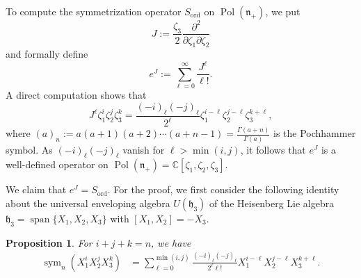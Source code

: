 \documentclass[a4paper,11pt,reqno]{amsart}
\newcommand{\frakh}{\mathfrak{h}}
\newcommand{\frakn}{\mathfrak{n}}
\newcommand{\0}{{\bf 0}}
\newcommand{\C}{\mathbb{C}}
\newcommand{\1}{{\bf 1}}
\DeclareMathOperator{\Span}{span}
\DeclareMathOperator{\Pol}{Pol}
\newcommand{\ord}{{\mathrm{ord}}}
\DeclareMathOperator{\sym}{sym}
\theoremstyle{plain}
\newtheorem{proposition}[equation]{Proposition}
\theoremstyle{definition}
\numberwithin{equation}{section}
\theoremstyle{definition}
\begin{document}
To compute the symmetrization operator $S_{\ord}$ on $\Pol(\frakn_+)$,
we put
\begin{equation*}
J:=\frac{\zeta_3}{2}\frac{\partial^2}{\partial\zeta_1\partial\zeta_2}
\end{equation*}
and formally define
\begin{equation*}
e^{J}:=\sum_{\ell=0}^\infty \frac{J^\ell}{\ell!}.
\end{equation*}
A direct computation shows that
\begin{equation}\label{eqn:JL}
J^\ell
\zeta_1^i\zeta_2^j\zeta_3^k = 
\frac{(-i)_\ell (-j)_\ell}{2^\ell}\zeta_1^{i-\ell}\zeta_2^{j-\ell}\zeta_3^{k+\ell},
\end{equation}
where $(a)_n:=a(a+1)(a+2)\cdots (a+n-1) = \frac{\Gamma(a+n)}{\Gamma(a)}$ is the Pochhammer symbol.
As $(-i)_\ell(-j)_\ell$ vanish for $\ell>\min(i,j)$, it follows that $e^{J}$ is a well-defined operator on $\Pol(\frakn_+)= \C[\zeta_1, \zeta_2, \zeta_3]$.

We claim that $e^{J}=S_{\ord}$.
For the proof, we first consider the following identity about
the universal enveloping algebra
$U(\frakh_3)$ of the Heisenberg Lie algebra 
$\frakh_3 = \Span\{X_1, X_2, X_3\}$ with $[X_1, X_2]=-X_3$.

\begin{proposition}\label{Prop:SymmetrizationMapIdentity}
For $i+j+k =n$,
we have
\begin{align}\label{eqn:HeisSym}
\sym_n(X_1^iX_2^jX_3^k)
&=\sum_{\ell=0}^{\min(i,j)}\frac{(-i)_\ell(-j)_\ell}{2^\ell \ell!}
X_1^{i-\ell}X_2^{j-\ell}X_3^{k+\ell}.
\end{align}
\end{proposition}
\end{document}
